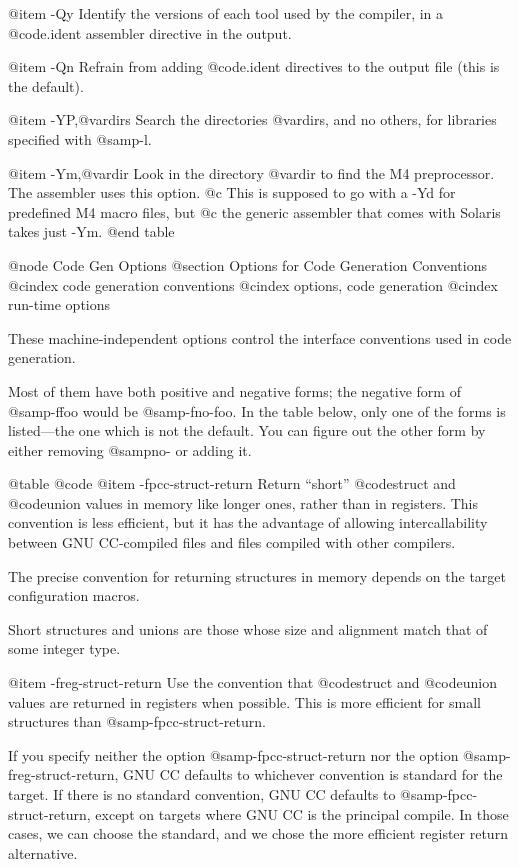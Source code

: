 {{@item -Qy
Identify the versions of each tool used by the compiler, in a
@code{.ident} assembler directive in the output.

@item -Qn
Refrain from adding @code{.ident} directives to the output file (this is
the default).

@item -YP,@var{dirs}
Search the directories @var{dirs}, and no others, for libraries
specified with @samp{-l}.

@item -Ym,@var{dir}
Look in the directory @var{dir} to find the M4 preprocessor.
The assembler uses this option.
@c This is supposed to go with a -Yd for predefined M4 macro files, but 
@c the generic assembler that comes with Solaris takes just -Ym.
@end table

@node Code Gen Options
@section Options for Code Generation Conventions
@cindex code generation conventions
@cindex options, code generation 
@cindex run-time options

These machine-independent options control the interface conventions
used in code generation.

Most of them have both positive and negative forms; the negative form
of @samp{-ffoo} would be @samp{-fno-foo}.  In the table below, only
one of the forms is listed---the one which is not the default.  You
can figure out the other form by either removing @samp{no-} or adding
it.

@table @code
@item -fpcc-struct-return
Return ``short'' @code{struct} and @code{union} values in memory like
longer ones, rather than in registers.  This convention is less
efficient, but it has the advantage of allowing intercallability between
GNU CC-compiled files and files compiled with other compilers.

The precise convention for returning structures in memory depends
on the target configuration macros.

Short structures and unions are those whose size and alignment match
that of some integer type.

@item -freg-struct-return
Use the convention that @code{struct} and @code{union} values are
returned in registers when possible.  This is more efficient for small
structures than @samp{-fpcc-struct-return}.

If you specify neither the option @samp{-fpcc-struct-return} nor the
option @samp{-freg-struct-return}, GNU CC defaults to whichever
convention is standard for the target.  If there is no standard
convention, GNU CC defaults to @samp{-fpcc-struct-return}, except on
targets where GNU CC is the principal compile.  In those cases, we can
choose the standard, and we chose the more efficient register return
alternative.

}}
